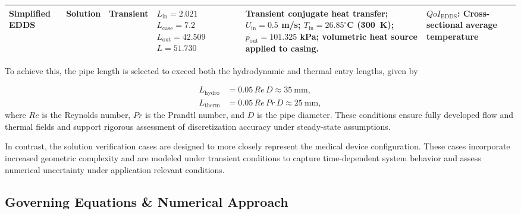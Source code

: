 \begin{table}[htbp]
\begin{tabular}{P{2.4cm}P{1.8cm}P{1.4cm}P{2.4cm}P{3.6cm}P{3.6cm}}
        \midrule
        Simplified EDDS
        & Solution
        & Transient
        & $L_{\mathrm{in}}=2.021$\newline
          $L_{\mathrm{case}}=7.2$\newline
          $L_{\mathrm{out}}=42.509$\newline
          $L=51.730$
        & Transient conjugate heat transfer;
          $U_{\mathrm{in}}=0.5$ m/s;
          $T_{\mathrm{in}}=26.85^\circ$C (300~K);
          $p_{\mathrm{out}}=101.325$ kPa;
          volumetric heat source applied to casing.
        &  $QoI_{\mathrm{EDDS}}$: Cross-sectional average temperature \\
        
        \bottomrule
    \end{tabular}
    \label{tab:geometry_qty}
\end{table}


To achieve this, the pipe length is selected to exceed both the hydrodynamic and thermal entry lengths, given by

\begin{equation}
\begin{aligned}
L_{\mathrm{hydro}} &= 0.05\,Re\,D \approx 35~\mathrm{mm}, \\
L_{\mathrm{therm}} &= 0.05\,Re\,Pr\,D \approx 25~\mathrm{mm},
\end{aligned}
\end{equation}
where $Re$ is the Reynolds number, $Pr$ is the Prandtl number, and $D$ is the pipe diameter. These conditions ensure fully developed flow and thermal fields and support rigorous assessment of discretization accuracy under steady-state assumptions.

In contrast, the solution verification cases are designed to more closely represent the medical device configuration. These cases incorporate increased geometric complexity and are modeled under transient conditions to capture time-dependent system behavior and assess numerical uncertainty under application relevant conditions.

\subsection{Governing Equations \& Numerical Approach}

